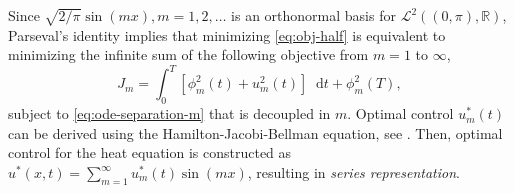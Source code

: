 \documentclass[journal,twoside,web]{ieeecolor}
\newcommand{\RR}{\mathbb{R}}
\newcommand{\state}{\phi}
\newcommand*\diff{\mathop{}\!\mathrm{d}}
\begin{document}

Since $\sqrt{2/\pi}\sin(m x),m=1,2,\ldots$ is an orthonormal basis for $\mathcal{L}^2((0,\pi),\RR)$, Parseval's identity implies that minimizing \eqref{eq:obj-half} is equivalent to minimizing the infinite sum of the following objective from $m=1$ to $\infty$,
\begin{equation}\label{eq:obj-separation}
	J_m = \int_0^T\left[\state_m^2(t)+u_m^2(t)\right]\diff t + \state_m^2(T),
\end{equation}
subject to \eqref{eq:ode-separation-m} that is decoupled in $m$.
Optimal control $u_m^*(t)$ can be derived using the Hamilton-Jacobi-Bellman equation, see .
 Then, optimal control for the heat equation is constructed as $u^*(x,t)=\sum_{m=1}^{\infty}u^*_m(t)\sin(m x)$, resulting in \emph{series representation}.
\end{document}
